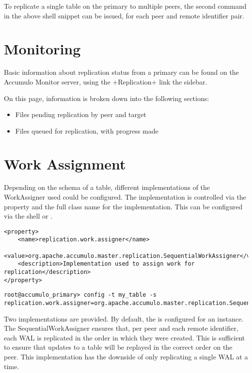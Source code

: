 To replicate a single table on the primary to multiple peers, the second command
in the above shell snippet can be issued, for each peer and remote identifier pair.

\section{Monitoring}

Basic information about replication status from a primary can be found on the Accumulo
Monitor server, using the +Replication+ link the sidebar.

On this page, information is broken down into the following sections:

\begin{itemize}
    \item Files pending replication by peer and target
    \item Files queued for replication, with progress made
\end{itemize}

\section{Work Assignment}

Depending on the schema of a table, different implementations of the WorkAssigner used could
be configured. The implementation is controlled via the property 
and the full class name for the implementation. This can be configured via the shell or
.

\begingroup\fontsize{8pt}{8pt}\selectfont\begin{verbatim}
<property>
    <name>replication.work.assigner</name>
    <value>org.apache.accumulo.master.replication.SequentialWorkAssigner</value>
    <description>Implementation used to assign work for replication</description>
</property>
\end{verbatim}\endgroup

\begingroup\fontsize{8pt}{8pt}\selectfont\begin{verbatim}
root@accumulo_primary> config -t my_table -s replication.work.assigner=org.apache.accumulo.master.replication.SequentialWorkAssigner
\end{verbatim}\endgroup

Two implementations are provided. By default, the  is configured for an
instance. The SequentialWorkAssigner ensures that, per peer and each remote identifier, each WAL is
replicated in the order in which they were created. This is sufficient to ensure that updates to a table
will be replayed in the correct order on the peer. This implementation has the downside of only replicating
a single WAL at a time.

